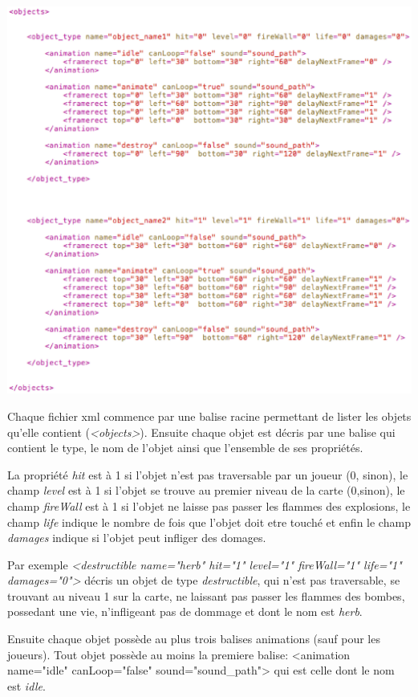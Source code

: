 		\includegraphics[width=15cm]{./Analyse/Img/exampleXmlBomberklob.eps}
		
			Chaque fichier \gls{xml} commence par une balise racine permettant 
			de lister les objets qu'elle contient (\textit{<objects>}).
			Ensuite chaque objet est décris par une balise  qui contient le type,
			le nom de l'objet ainsi que l'ensemble de ses propriétés.
			
			La propriété \textit{hit} est à 1 si l'objet n'est pas traversable par un joueur (0, sinon), 
			le champ \textit{level} est à 1 si l'objet se trouve au premier niveau de la carte (0,sinon), 
			le champ \textit{fireWall} est à 1 si l'objet ne laisse pas passer les flammes des explosions, 
			le champ \textit{life} indique le nombre de fois que l'objet doit etre touché
			et enfin le champ \textit{damages} indique si l'objet peut infliger des domages.
			
			Par exemple \textit{<destructible name="herb" hit="1" level="1" fireWall="1" life="1" damages="0">} 
			décris un objet de type \textit{destructible}, qui n'est pas traversable, se trouvant au niveau
			1 sur la carte, ne laissant pas passer les flammes des bombes, possedant une vie, 
			n'infligeant pas de dommage et dont le nom est \textit{herb}.
			
			Ensuite chaque objet possède au plus trois balises animations (sauf pour les joueurs).
			Tout objet possède au moins la premiere balise: 
			<animation name="idle" canLoop="false" sound="sound\_path"> 
			qui est celle dont le nom est \textit{idle}.
			
